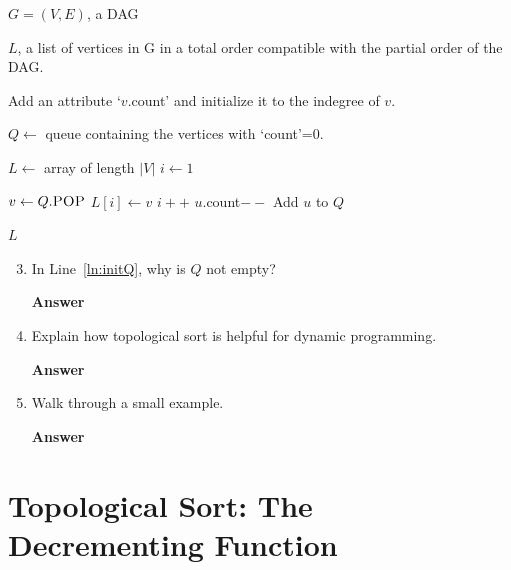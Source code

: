 \documentclass{article}
\begin{document}
\begin{algorithm}[h]
    \caption{Topological Sort}
    \begin{algorithmic}[1]
        \REQUIRE $G=(V,E)$, a DAG

        \ENSURE $L$, a list of vertices in G in a total order compatible with
        the partial order of the DAG.

            \STATE Add an attribute `$v$.count' and initialize it to the indegree of $v$.
        \ENDFOR

        \STATE $Q \gets$ queue containing the vertices with `count'=0.\label{ln:initQ}

        \STATE $L \gets$ array of length $|V|$
        \STATE $i \gets 1$

            \STATE $v \gets Q.\textsc{POP}$
            \STATE $L[i] \gets v$
            \STATE $i++$
                \STATE $u$.count$--$
                    \STATE Add $u$ to $Q$
                \ENDIF
            \ENDFOR
        \ENDWHILE

        \RETURN $L$
    \end{algorithmic}
\end{algorithm}

\pagebreak

\begin{enumerate}\setcounter{enumi}{2}

    \item In Line~\ref{ln:initQ}, why is $Q$ not empty?

        \textbf{Answer}
        \vspace{1in}

    \item   Explain how topological sort is helpful for dynamic programming.

        \textbf{Answer}
        \vspace{1in}

    \item Walk through a small example.

        \textbf{Answer}
\end{enumerate}

\pagebreak
\section*{Topological Sort: The Decrementing Function}
\end{document}

